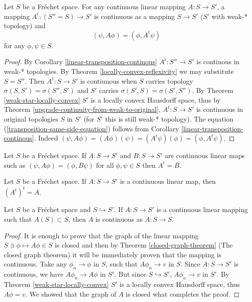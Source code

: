 \documentclass[main.tex]{subfiles}
\begin{document}
\begin{theorem}
Let $S$ be a Fr\'echet space. For any continuous linear mapping $A: S\to S'$, a mapping $A^t: (S''=S)\to S'$ is continuous as a mapping $S\to S'$ ($S'$ with weak-* topology) and 
\begin{equation}
\label{transposition-same-side-equation}
(\psi, A\phi) = (\phi, A^t \psi) 
\end{equation}
for any $\phi, \psi\in S$. 
\end{theorem}
\begin{proof}
By Corollary \ref{linear-transposition-continous} $A^t:S'' \to S'$ is continous in weak-* topologies. By Theorem \ref{locally-convex-reflexivity} we may substitute $S=S''$. Then $A^t:S\to S'$ is contiunous when $S$ carries topology $\sigma(S, S')=\sigma(S'', S')$ and $S'$ carries $\sigma(S', S)=\sigma(S', S'')$. By Theorem \ref{weak-star-locally-convex} $S'$ is a locally convex Hausdorff space, thus by Theorem \ref{upgrade-continuity-from-weak-to-original}, $A^t: S\to S'$ is continuous in original topologies $S$ in $S'$ (for $S'$ this is still weak-* topology). The equation (\ref{transposition-same-side-equation}) follows from Corollary \ref{linear-transposition-continous}. Indeed $(\psi, A\phi) = (A \phi)(\psi) = (A^t \psi)(\phi) = (\phi, A^t \psi)$.
\end{proof}
\begin{corollary}
\label{fretchet-establish-transposition}
Let $S$ be a Fr\'echet space. If $A:S\to S'$ and $B:S\to S'$ are continuous linear maps such as $(\psi, A\phi) = (\phi, B\psi)$ for all $\phi,\psi\in S$ then $A^t = B$.
\end{corollary}
\begin{corollary}
\label{fretchet-transpose-identity}
Let $S$ be a Fr\'echet space. If $A:S\to S'$ is a continuous linear map, then $(A^t)^t = A$.
\end{corollary}
\begin{theorem}
\label{fretchet-linear-strongly-continuous}
Let $S$ be a Fr\'echet space and $S \hookrightarrow S'$. If $A: S\to S'$ is a continuous linear mapping such that $A(S)\subset S$, then $A$ is continuous as $A:S\to S$.
\end{theorem}
\begin{proof}
It is enough to prove that the graph of the linear mapping $S\ni\phi\mapsto A \phi\in S$ is closed and then by Theorem \ref{closed-graph-theorem} (The closed graph theorem) it will be immediately proven that the mapping is continuous.
Take any $\phi_n\to\phi$ in $S$, such that $A\phi_n \to v$ in $S$. Since $A: S\to S'$ is continuous, we have $A\phi_n \to A\phi$ in $S'$. But since $S \hookrightarrow S'$, $A\phi_n\to v$ in $S'$. By Theorem \ref{weak-star-locally-convex} $S'$ is a locally convex Hausdorff space, thus $A\phi = v$. We showed that the graph of $A$ is closed what completes the proof.
\end{proof}
\end{document}
